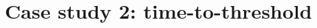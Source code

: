 \documentclass[xcolor=dvipsnames, USenglish]{beamer}  %
\begin{document}


\section{Case study 2: time-to-threshold}
\end{document}
